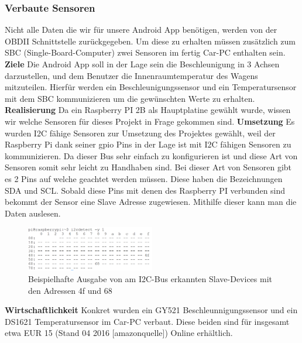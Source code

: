 \subsubsection{Verbaute Sensoren}
Nicht alle Daten die wir für unsere Android App benötigen, werden von der OBDII Schnittstelle
zurückgegeben. Um diese zu erhalten müssen zusätzlich zum SBC (Single-Board-Computer) zwei Sensoren im fertig Car-PC enthalten sein.
\nextline
\textbf{Ziele\newline}
\newline
Die Android App soll in der Lage sein die Beschleunigung in 3 Achsen darzustellen, und dem Benutzer
die Innenraumtemperatur des Wagens mitzuteilen.
Hierfür werden ein Beschleunigungssensor und ein Temperatursensor mit dem SBC kommunizieren
um die gewünschten Werte zu erhalten.
\nextline
\textbf{Realisierung\newline}
\newline
Da ein Raspberry PI 2B als Hauptplatine gewählt wurde, wissen wir welche Sensoren für dieses Projekt in Frage gekommen sind.
\nextline
\textbf{Umsetzung\newline}
\newline
Es wurden I2C fähige Sensoren zur Umsetzung des Projektes gewählt, weil der Raspberry Pi dank seiner gpio Pins in der Lage ist mit I2C fähigen Sensoren zu kommunizieren. Da dieser Bus sehr einfach zu konfigurieren ist und diese Art von Sensoren somit sehr leicht zu Handhaben sind.
Bei dieser Art von Sensoren gibt es 2 Pins auf welche geachtet werden müssen. Diese haben die Bezeichnungen SDA und SCL. Sobald diese Pins mit denen des Raspberry PI verbunden sind bekommt der Sensor eine Slave Adresse zugewiesen. Mithilfe dieser kann man die Daten auslesen.
\begin{figure}[!htb]\centering
	\includegraphics[width=0.5\textwidth]{images/sensorendetect}
	\caption{Beispielhafte Ausgabe von am I2C-Bus erkannten Slave-Devices mit den Adressen 4f und 68}\label{Fig:imgSensorDetect}
\end{figure}
\newpage
\textbf{Wirtschaftlichkeit\newline}
\newline
Konkret wurden ein GY521 Beschleunnigungssensor und ein DS1621 Temperatursensor im Car-PC verbaut. Diese beiden sind für insgesamt etwa EUR 15 (Stand 04 2016 [amazonquelle]) Online erhältlich.

